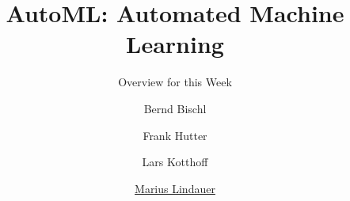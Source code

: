 




\title[AutoML: Overview]{AutoML: Automated Machine Learning}
\subtitle{Overview for this Week}
\author[Marius Lindauer]{Bernd Bischl \and Frank Hutter \and Lars Kotthoff \and \underline{Marius Lindauer}}
\institute{}
\date{}





	
	\maketitle
	

